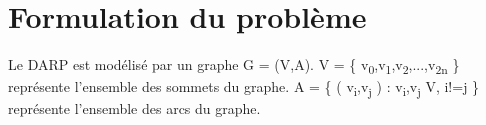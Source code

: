 \documentclass[12pt,a4paper]{report}
\begin{document}
\section*{Formulation du problème}
Le DARP est modélisé par un graphe G = (V,A). V = \{ v\textsubscript{0},v\textsubscript{1},v\textsubscript{2},...,v\textsubscript{2n} \} représente l'ensemble des sommets du graphe. 
A = \{ ( v\textsubscript{i},v\textsubscript{j} ) : v\textsubscript{i},v\textsubscript{j}  V, i!=j \} représente l'ensemble des arcs du graphe.
    
\end{document}
